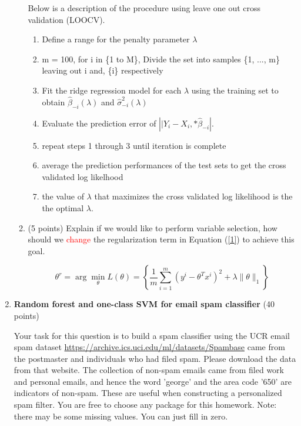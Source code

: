 \documentclass[twoside,10pt]{article}
\begin{document}
\begin{enumerate}
\begin{enumerate}
\vspace{5 mm}

Below is a description of the procedure using leave one out cross validation (LOOCV).

\begin{enumerate}
	\item Define a range for the penalty parameter $\lambda$
	\item m = 100, for i in \{1 to M\}, Divide the set into samples \{1, ..., m\} leaving out i and, \{i\} respectively 
	\item Fit the ridge regression model for each $\lambda$ using the training set to obtain $\hat \beta_{-i}(\lambda)$ and $\hat \sigma_{-i}^2(\lambda)$
	\item Evaluate the prediction error of $\left\lvert|Y_{i} - X_{i}, *\hat \beta_{-i}\right\rvert$.
	\item repeat steps 1 through 3 until iteration is complete
	\item average the prediction performances of the test sets to get the cross validated log likelhood
	\item the value of $\lambda$ that maximizes the cross validated log likelihood is the the optimal $\lambda$.
\end{enumerate}

\vspace{5 mm}

\item (5 points) Explain if we would like to perform variable selection, how should we \textcolor{red}{change} the regularization term in Equation (\ref{1}) to achieve this goal. 


\begin{equation} \label{1}
\theta^r
= \arg\min_{\theta} L(\theta)=
\left\{
\frac 1 m \sum_{i=1}^m (y^i - {\theta}^T x^i)^2 + \lambda \|\theta\|_1
\right\}
\end{equation}

\end{enumerate}



\clearpage

\item {\bf Random forest and one-class SVM for email spam classifier} (40 points)

Your task for this question is to build a spam classifier using the UCR email spam dataset \url{https://archive.ics.uci.edu/ml/datasets/Spambase} came from the postmaster and individuals who had filed spam. Please download the data from that website. The collection of non-spam emails came from filed work and personal emails, and hence the word \textsf{'george'} and the area code \textsf{'650'} are indicators of non-spam. These are useful when constructing a personalized spam filter. You are free to choose any package for this homework. Note: there may be some missing values. You can just fill in zero.


\end{enumerate}
\end{document}
